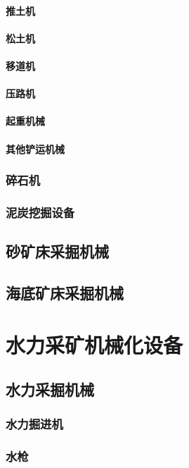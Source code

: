 \documentclass[UTF8]{../../ApplicationUniverse}
\begin{document}
            \paragraph{推土机}
            \paragraph{松土机}
            \paragraph{移道机}
            \paragraph{压路机}
            \paragraph{起重机械}
            \paragraph{其他铲运机械}
        \subsubsection{碎石机}
        \subsubsection{泥炭挖掘设备}
    \subsection{砂矿床采掘机械}
    \subsection{海底矿床采掘机械}
\section{水力采矿机械化设备}
    \subsection{水力采掘机械}
        \subsubsection{水力掘进机}
        \subsubsection{水枪}
\end{document}

